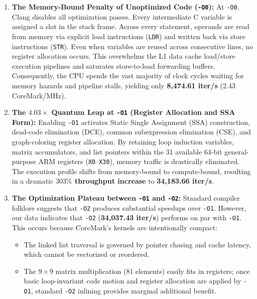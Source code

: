 \documentclass[11pt,a4paper]{article}
\begin{document}
\begin{enumerate}[leftmargin=1.4em]
    \item \textbf{The Memory-Bound Penalty of Unoptimized Code (\texttt{-O0}):}
    At \texttt{-O0}, Clang disables all optimization passes. Every intermediate C variable is assigned a slot in the stack frame. Across every statement, operands are read from memory via explicit load instructions (\texttt{LDR}) and written back via store instructions (\texttt{STR}). Even when variables are reused across consecutive lines, no register allocation occurs. This overwhelms the L1 data cache load/store execution pipelines and saturates store-to-load forwarding buffers. Consequently, the CPU spends the vast majority of clock cycles waiting for memory hazards and pipeline stalls, yielding only \textbf{8,474.61 iter/s} (2.43 CoreMark/MHz).

    \item \textbf{The $4.03\times$ Quantum Leap at \texttt{-O1} (Register Allocation and SSA Form):}
    Enabling \texttt{-O1} activates Static Single Assignment (SSA) construction, dead-code elimination (DCE), common subexpression elimination (CSE), and graph-coloring register allocation. By retaining loop induction variables, matrix accumulators, and list pointers within the 31 available 64-bit general-purpose ARM registers (\texttt{X0}--\texttt{X30}), memory traffic is drastically eliminated. The execution profile shifts from memory-bound to compute-bound, resulting in a dramatic \textbf{$303\%$ throughput increase} to \textbf{34,183.66 iter/s}.

    \item \textbf{The Optimization Plateau between \texttt{-O1} and \texttt{-O2}:}
    Standard compiler folklore suggests that \texttt{-O2} produces substantial speedups over \texttt{-O1}. However, our data indicates that \texttt{-O2} (\textbf{34,037.43 iter/s}) performs on par with \texttt{-O1}. This occurs because CoreMark's kernels are intentionally compact:
    \begin{itemize}
        \item The linked list traversal is governed by pointer chasing and cache latency, which cannot be vectorized or reordered.
        \item The $9\times 9$ matrix multiplication ($81$ elements) easily fits in registers; once basic loop-invariant code motion and register allocation are applied by \texttt{-O1}, standard \texttt{-O2} inlining provides marginal additional benefit.
    \end{itemize}


\end{enumerate}
\end{document}
